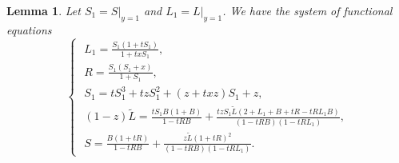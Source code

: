 \documentclass[12pt]{amsart}
\numberwithin{equation}{section}
\theoremstyle{plain}
\newtheorem{lemma}[theorem]{Lemma}
\theoremstyle{definition}
\begin{document}
\begin{lemma}
Let $S_1=S|_{y=1}$ and $L_1=L|_{y=1}$. We have the system of functional equations
\begin{equation}\label{sym:sepa}
\begin{cases}
\,\, L_1=\frac{S_1(1+tS_1)}{1+txS_1},\\
\,\,  R=\frac{S_1(S_1+x)}{1+S_1},\\
\,\, S_1=tS_1^3+tzS_1^2+(z+txz)S_1+z,\\
\,\, (1-z)\tilde L=\frac{tS_1B(1+B)}{1-tRB}+\frac{tzS_1\tilde L(2+L_1+B+tR-tRL_1B)}{(1-tRB)(1-tRL_1)},\\
\,\, S=\frac{B(1+tR)}{1-tRB}+\frac{z\tilde{L}(1+tR)^2}{(1-tRB)(1-tRL_1)}.
\end{cases}
\end{equation}
\end{lemma}
\end{document}
